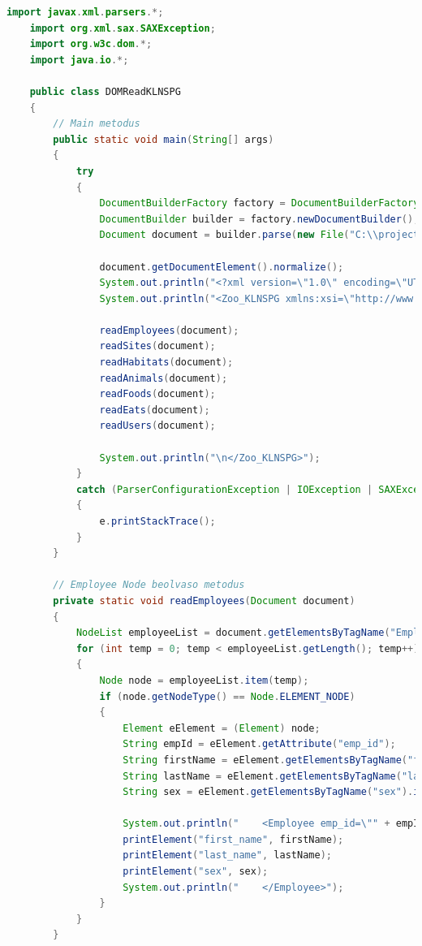\documentclass[12pt]{report}
\begin{document}
\begin{lstlisting}[caption={DOMReadKLNSPG.java} olvasó program, language=Java]
	import javax.xml.parsers.*;
	import org.xml.sax.SAXException;
	import org.w3c.dom.*;
	import java.io.*;
	
	public class DOMReadKLNSPG
	{
		// Main metodus
		public static void main(String[] args) 
		{
			try 
			{
				DocumentBuilderFactory factory = DocumentBuilderFactory.newInstance();
				DocumentBuilder builder = factory.newDocumentBuilder();
				Document document = builder.parse(new File("C:\\projects\\KLNSPG_XMLGyak\\XMLTaskKLNSPG\\XMLKLNSPG.xml"));
				
				document.getDocumentElement().normalize();
				System.out.println("<?xml version=\"1.0\" encoding=\"UTF-8\"?>\n");
				System.out.println("<Zoo_KLNSPG xmlns:xsi=\"http://www.w3.org/2001/XMLSchema-instance\" xsi:noNamespaceSchemaLocation=\"XMLSchemaKLNSPG.xsd\">\n");
				
				readEmployees(document);
				readSites(document);
				readHabitats(document);
				readAnimals(document);
				readFoods(document);
				readEats(document);
				readUsers(document);
				
				System.out.println("\n</Zoo_KLNSPG>");
			} 
			catch (ParserConfigurationException | IOException | SAXException e)
			{
				e.printStackTrace();
			}
		}
		
		// Employee Node beolvaso metodus
		private static void readEmployees(Document document) 
		{
			NodeList employeeList = document.getElementsByTagName("Employee");
			for (int temp = 0; temp < employeeList.getLength(); temp++) 
			{
				Node node = employeeList.item(temp);
				if (node.getNodeType() == Node.ELEMENT_NODE) 
				{
					Element eElement = (Element) node;
					String empId = eElement.getAttribute("emp_id");
					String firstName = eElement.getElementsByTagName("first_name").item(0).getTextContent();
					String lastName = eElement.getElementsByTagName("last_name").item(0).getTextContent();
					String sex = eElement.getElementsByTagName("sex").item(0).getTextContent();
					
					System.out.println("    <Employee emp_id=\"" + empId + "\">");
					printElement("first_name", firstName);
					printElement("last_name", lastName);
					printElement("sex", sex);
					System.out.println("    </Employee>");
				}
			}
		}
		

\end{lstlisting}
\end{document}

